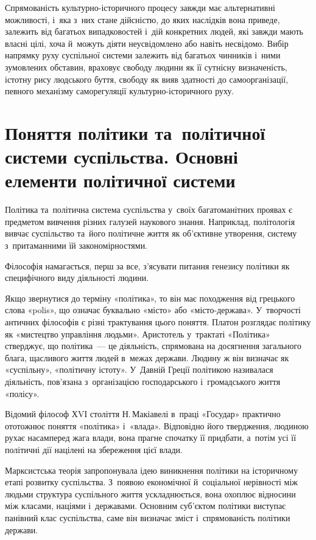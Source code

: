\documentclass[a5paper,oneside,DIV=12,12pt,headings=small]{scrartcl}
\begin{document}
		Спрямованість культурно-історичного процесу завжди має альтернативні можливості, і~яка з~них стане дійсністю, до яких наслідків вона приведе, залежить від багатьох випадковостей і~дій конкретних людей, які завжди мають власні цілі, хоча й~можуть діяти неусвідомлено або навіть несвідомо. Вибір напрямку руху суспільної системи залежить від багатьох чинників і~ними зумовлених обставин, враховує свободу людини як її сутнісну визначеність, істотну рису людського буття, свободу як вияв здатності до самоорганізації, певного механізму саморегуляції культурно-історичного руху.
		
	\section{Поняття політики та~політичної системи суспільства. Основні елементи політичної системи}
		Політика та~політична система суспільства у~своїх багатоманітних проявах є предметом вивчення різних галузей наукового знання. 
		Наприклад, політологія вивчає суспільство та~його політичне життя як об'\-єктивне утворення, систему з~притаманними їй закономірностями.
		
		Філософія намагається, перш за все, з'ясувати питання генезису політики як специфічного виду діяльності людини.
		
		Якщо звернутися до терміну «політика», то він має походження від грецького слова «polis», що означає буквально «місто» або «місто-держава». У~творчості античних філософів є різні трактування цього поняття. Платон розглядає політику як «мистецтво управління людьми». Аристотель у~трактаті «Політика» стверджує, що політика~— це діяльність, спрямована на досягнення загального блага, щасливого життя людей в~межах держави. Людину ж він визначає як «суспільну», «політичну істоту». У~Давній Греції політикою називалася діяльність, пов'язана з~організацією господарського і~громадського життя «полісу».
		
		Відомий філософ ХVІ століття Н.\,Макіавелі в~праці «Государ» практично ототожнює поняття «політика» і~«влада». Відповідно його твердження, людиною рухає насамперед жага влади, вона прагне спочатку її придбати, а~потім усі її політичні дії націлені на збереження цієї влади.
		
		Марксистська теорія запропонувала ідею виникнення політики на історичному етапі розвитку суспільства. З~появою економічної й~соціальної нерівності між людьми структура суспільного життя ускладнюється, вона охоплює відносини між класами, націями і~державами. Основним суб'\-єктом політики виступає панівний клас суспільства, саме він визначає зміст і~спрямованість політики держави.
		
\end{document}
